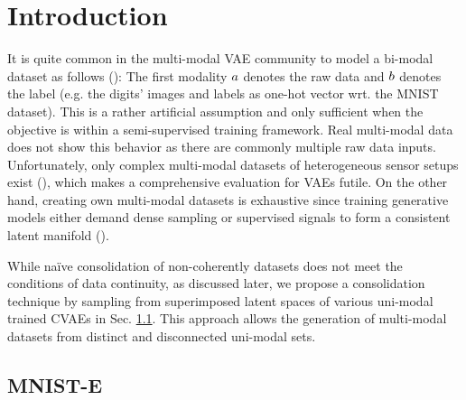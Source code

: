 \section{Introduction}
\label{sec:data_generation}
%
It is quite common in the multi-modal VAE community to model a bi-modal dataset as follows (\cite{Wang2016_2,Ngiam2011,Suzuki2017,Vedantam2017}):
%
The first modality $a$ denotes the raw data and $b$ denotes the label (e.g. the digits' images and labels as one-hot vector wrt. the MNIST dataset).
%
This is a rather artificial assumption and only sufficient when the objective is within a semi-supervised training framework.
%
Real multi-modal data does not show this behavior as there are commonly multiple raw data inputs.
%
Unfortunately, only complex multi-modal datasets of heterogeneous sensor setups exist (\cite{Ofli2013,udacity2016,kragh2017fieldsafe}), which makes a comprehensive evaluation for VAEs futile.
%
On the other hand, creating own multi-modal datasets is exhaustive since  training generative models either demand dense sampling or supervised signals to form a consistent latent manifold (\cite{bengio2012}).
%
%

While na\"ive consolidation of non-coherently datasets does not meet the conditions of data continuity, as discussed later, we propose a consolidation technique by sampling from superimposed latent spaces of various uni-modal trained CVAEs in Sec. \ref{sec:mm_set_generation}.
%
This approach allows the generation of multi-modal datasets from distinct and disconnected uni-modal sets.
%

\subsection{MNIST-E}
\label{sec:mm_set_generation}

